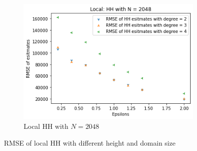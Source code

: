 \documentclass[11pt]{article}
\theoremstyle{definition}
\begin{document}
\begin{figure}[H]
\begin{subfigure}[b]{0.3\textwidth}
         \includegraphics[width=\textwidth]{figures/hh_loc_epsi/hh_N=2048.png}
         \caption{Local HH with $N=2048$}
         \label{fig:f}
     \end{subfigure}
        \caption{RMSE of local HH with different height and domain size}
        \label{fig:esp_loc_hh}
\end{figure}
\end{document}
